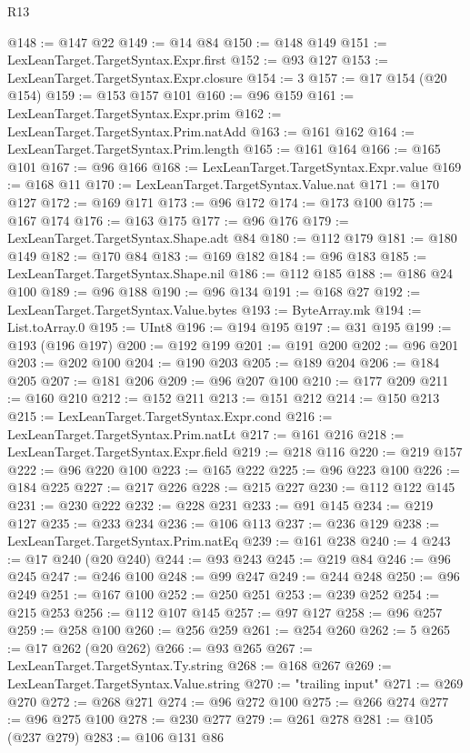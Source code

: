 \begin{lexlean}{R13}
\begin{coremodule}
@148 := @147 @22
@149 := @14 @84
@150 := @148 @149
@151 := LexLeanTarget.TargetSyntax.Expr.first
@152 := @93 @127
@153 := LexLeanTarget.TargetSyntax.Expr.closure
@154 := 3
@157 := @17 @154 (@20 @154)
@159 := @153 @157 @101
@160 := @96 @159
@161 := LexLeanTarget.TargetSyntax.Expr.prim
@162 := LexLeanTarget.TargetSyntax.Prim.natAdd
@163 := @161 @162
@164 := LexLeanTarget.TargetSyntax.Prim.length
@165 := @161 @164
@166 := @165 @101
@167 := @96 @166
@168 := LexLeanTarget.TargetSyntax.Expr.value
@169 := @168 @11
@170 := LexLeanTarget.TargetSyntax.Value.nat
@171 := @170 @127
@172 := @169 @171
@173 := @96 @172
@174 := @173 @100
@175 := @167 @174
@176 := @163 @175
@177 := @96 @176
@179 := LexLeanTarget.TargetSyntax.Shape.adt @84
@180 := @112 @179
@181 := @180 @149
@182 := @170 @84
@183 := @169 @182
@184 := @96 @183
@185 := LexLeanTarget.TargetSyntax.Shape.nil
@186 := @112 @185
@188 := @186 @24 @100
@189 := @96 @188
@190 := @96 @134
@191 := @168 @27
@192 := LexLeanTarget.TargetSyntax.Value.bytes
@193 := ByteArray.mk
@194 := List.toArray.{0}
@195 := UInt8
@196 := @194 @195
@197 := @31 @195
@199 := @193 (@196 @197)
@200 := @192 @199
@201 := @191 @200
@202 := @96 @201
@203 := @202 @100
@204 := @190 @203
@205 := @189 @204
@206 := @184 @205
@207 := @181 @206
@209 := @96 @207 @100
@210 := @177 @209
@211 := @160 @210
@212 := @152 @211
@213 := @151 @212
@214 := @150 @213
@215 := LexLeanTarget.TargetSyntax.Expr.cond
@216 := LexLeanTarget.TargetSyntax.Prim.natLt
@217 := @161 @216
@218 := LexLeanTarget.TargetSyntax.Expr.field
@219 := @218 @116
@220 := @219 @157
@222 := @96 @220 @100
@223 := @165 @222
@225 := @96 @223 @100
@226 := @184 @225
@227 := @217 @226
@228 := @215 @227
@230 := @112 @122 @145
@231 := @230 @222
@232 := @228 @231
@233 := @91 @145
@234 := @219 @127
@235 := @233 @234
@236 := @106 @113
@237 := @236 @129
@238 := LexLeanTarget.TargetSyntax.Prim.natEq
@239 := @161 @238
@240 := 4
@243 := @17 @240 (@20 @240)
@244 := @93 @243
@245 := @219 @84
@246 := @96 @245
@247 := @246 @100
@248 := @99 @247
@249 := @244 @248
@250 := @96 @249
@251 := @167 @100
@252 := @250 @251
@253 := @239 @252
@254 := @215 @253
@256 := @112 @107 @145
@257 := @97 @127
@258 := @96 @257
@259 := @258 @100
@260 := @256 @259
@261 := @254 @260
@262 := 5
@265 := @17 @262 (@20 @262)
@266 := @93 @265
@267 := LexLeanTarget.TargetSyntax.Ty.string
@268 := @168 @267
@269 := LexLeanTarget.TargetSyntax.Value.string
@270 := "trailing input"
@271 := @269 @270
@272 := @268 @271
@274 := @96 @272 @100
@275 := @266 @274
@277 := @96 @275 @100
@278 := @230 @277
@279 := @261 @278
@281 := @105 (@237 @279)
@283 := @106 @131 @86

\end{coremodule}
\end{lexlean}
